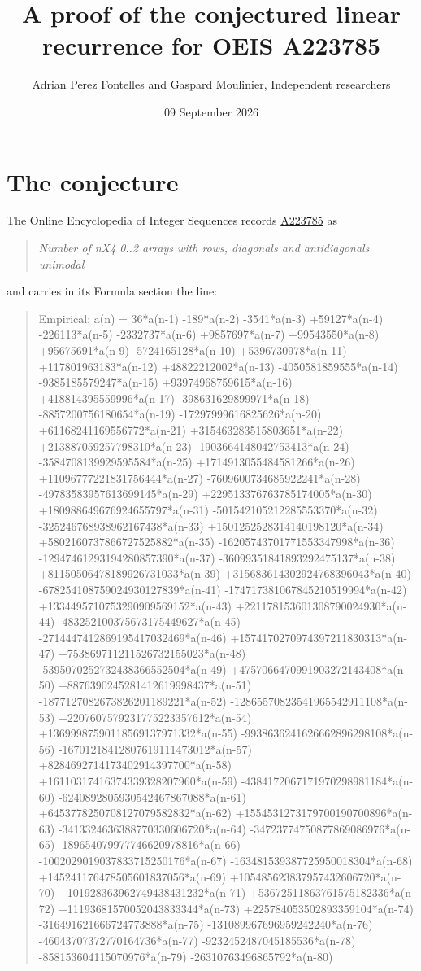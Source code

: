 \documentclass[11pt]{article}
\title{A proof of the conjectured linear recurrence for OEIS A223785}
\author{Adrian Perez Fontelles and Gaspard Moulinier, Independent researchers}
\date{09 September 2026}
\theoremstyle{definition}
\begin{document}
\maketitle
\section{The conjecture}

The Online Encyclopedia of Integer Sequences records \href{https://oeis.org/A223785}{A223785} as

\begin{quote}\itshape Number of nX4 0..2 arrays with rows, diagonals and antidiagonals unimodal\end{quote}

and carries in its Formula section the line:

\begin{quote}\ttfamily Empirical: a(n) = 36*a(n-1) -189*a(n-2) -3541*a(n-3) +59127*a(n-4) -226113*a(n-5) -2332737*a(n-6) +9857697*a(n-7) +99543550*a(n-8) +95675691*a(n-9) -5724165128*a(n-10) +5396730978*a(n-11) +117801963183*a(n-12) +48822212002*a(n-13) -4050581859555*a(n-14) -9385185579247*a(n-15) +93974968759615*a(n-16) +418814395559996*a(n-17) -398631629899971*a(n-18) -8857200756180654*a(n-19) -17297999616825626*a(n-20) +61168241169556772*a(n-21) +315463283515803651*a(n-22) +213887059257798310*a(n-23) -1903664148042753413*a(n-24) -3584708139929595584*a(n-25) +1714913055484581266*a(n-26) +11096777221831756444*a(n-27) -7609600734685922241*a(n-28) -49783583957613699145*a(n-29) +229513376763785174005*a(n-30) +180988649676924655797*a(n-31) -501542105212285553370*a(n-32) -325246768938962167438*a(n-33) +1501252528314140198120*a(n-34) +5802160737866727525882*a(n-35) -16205743701771553347998*a(n-36) -12947461293194280857390*a(n-37) -36099351841893292475137*a(n-38) +81150506478189926731033*a(n-39) +315683614302924768396043*a(n-40) -678254108759024930127839*a(n-41) -174717381067845210519994*a(n-42) +1334495710753290909569152*a(n-43) +221178153601308790024930*a(n-44) -483252100375673175449627*a(n-45) -2714447412869195417032469*a(n-46) +1574170270974397211830313*a(n-47) +753869711211526732155023*a(n-48) -5395070252732438366552504*a(n-49) +4757066470991903272143408*a(n-50) +8876390245281412619998437*a(n-51) -1877127082673826201189221*a(n-52) -12865570823541965542911108*a(n-53) +2207607579231775223357612*a(n-54) +13699987590118569137971332*a(n-55) -9938636241626662896298108*a(n-56) -16701218412807619111473012*a(n-57) +8284692714173402914397700*a(n-58) +16110317416374339328207960*a(n-59) -4384172067171970298981184*a(n-60) -6240892805930542467867088*a(n-61) +6453778250708127079582832*a(n-62) +1554531273179700190700896*a(n-63) -3413324636388770330606720*a(n-64) -34723774750877869086976*a(n-65) -189654079977746620978816*a(n-66) -1002029019037833715250176*a(n-67) -163481539387725950018304*a(n-68) +145241176478505601837056*a(n-69) +105485623837957432606720*a(n-70) +101928363962749438431232*a(n-71) +53672511863761575182336*a(n-72) +11193681570052043833344*a(n-73) +225784053502893359104*a(n-74) -316491621666724773888*a(n-75) -131089967696959242240*a(n-76) -46043707372770164736*a(n-77) -9232452487045185536*a(n-78) -858153604115070976*a(n-79) -26310763496865792*a(n-80)\end{quote}
\end{document}
